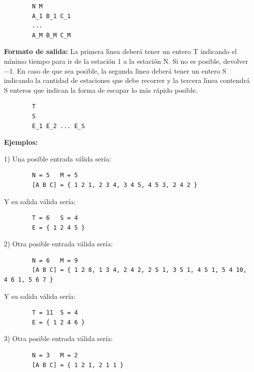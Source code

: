         \begin{verbatim}
        N M
        A_1 B_1 C_1
        ...
        A_M B_M C_M
        \end{verbatim}
        
        \textbf{Formato de salida:} La primera lı́nea deberá tener un entero T indicando el mı́nimo tiempo para ir de la estación 1 a la estación N. Si no es posible, devolver −1. En caso de que sea posible, la segunda lı́nea deberá tener un entero S indicando la cantidad de estaciones que debe recorrer y la tercera lı́nea contendrá S enteros que indican la forma de escapar lo más rápido posible.
        
        \begin{verbatim}
        T
        S
        E_1 E_2 ... E_S
        \end{verbatim}
        
        \textbf{Ejemplos:}
        
        1)
        Una posible entrada válida sería:
        
        \begin{verbatim}
        N = 5   M = 5
        [A B C] = { 1 2 1, 2 3 4, 3 4 5, 4 5 3, 2 4 2 }
        \end{verbatim}

        Y su salida válida sería:

        \begin{verbatim}
        T = 6   S = 4
        E = { 1 2 4 5 }
        \end{verbatim}

        2)
        Otra posible entrada válida sería:
        
        \begin{verbatim}
        N = 6   M = 9
        [A B C] = { 1 2 8, 1 3 4, 2 4 2, 2 5 1, 3 5 1, 4 5 1, 5 4 10, 4 6 1, 5 6 7 }
        \end{verbatim}

        Y su salida válida sería:

        \begin{verbatim}
        T = 11  S = 4
        E = { 1 2 4 6 }
        \end{verbatim}

        3)
        Otra posible entrada válida sería:
        
        \begin{verbatim}
        N = 3   M = 2
        [A B C] = { 1 2 1, 2 1 1 }
        \end{verbatim}

